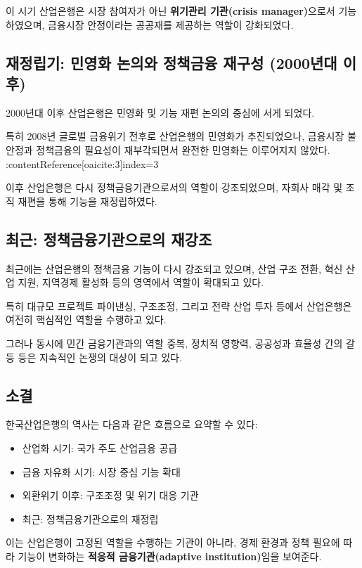 이 시기 산업은행은 시장 참여자가 아닌 \textbf{위기관리 기관(crisis manager)}으로서 기능하였으며, 금융시장 안정이라는 공공재를 제공하는 역할이 강화되었다.

\subsection{재정립기: 민영화 논의와 정책금융 재구성 (2000년대 이후)}

2000년대 이후 산업은행은 민영화 및 기능 재편 논의의 중심에 서게 되었다.

특히 2008년 글로벌 금융위기 전후로 산업은행의 민영화가 추진되었으나, 금융시장 불안정과 정책금융의 필요성이 재부각되면서 완전한 민영화는 이루어지지 않았다. :contentReference[oaicite:3]{index=3}  

이후 산업은행은 다시 정책금융기관으로서의 역할이 강조되었으며, 자회사 매각 및 조직 재편을 통해 기능을 재정립하였다.

\subsection{최근: 정책금융기관으로의 재강조}

최근에는 산업은행의 정책금융 기능이 다시 강조되고 있으며, 산업 구조 전환, 혁신 산업 지원, 지역경제 활성화 등의 영역에서 역할이 확대되고 있다.

특히 대규모 프로젝트 파이낸싱, 구조조정, 그리고 전략 산업 투자 등에서 산업은행은 여전히 핵심적인 역할을 수행하고 있다.

그러나 동시에 민간 금융기관과의 역할 중복, 정치적 영향력, 공공성과 효율성 간의 갈등 등은 지속적인 논쟁의 대상이 되고 있다.

\subsection{소결}

한국산업은행의 역사는 다음과 같은 흐름으로 요약할 수 있다:

\begin{itemize}
    \item 산업화 시기: 국가 주도 산업금융 공급
    \item 금융 자유화 시기: 시장 중심 기능 확대
    \item 외환위기 이후: 구조조정 및 위기 대응 기관
    \item 최근: 정책금융기관으로의 재정립
\end{itemize}

이는 산업은행이 고정된 역할을 수행하는 기관이 아니라, 경제 환경과 정책 필요에 따라 기능이 변화하는 \textbf{적응적 금융기관(adaptive institution)}임을 보여준다.